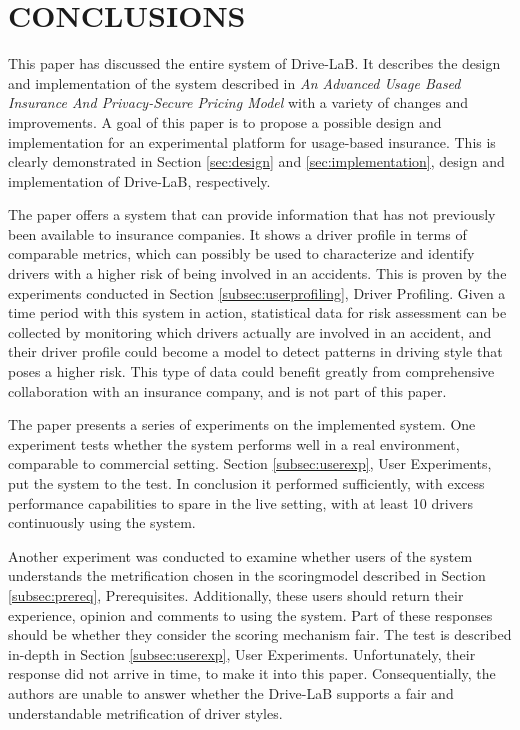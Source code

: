 \section{CONCLUSIONS}\label{sec:conclusion}
This paper has discussed the entire system of Drive-LaB. It describes the design and implementation of the system described in \textit{An Advanced Usage Based Insurance And Privacy-Secure Pricing Model}\citep{sw9_report} with a variety of changes and improvements. A goal of this paper is to propose a possible design and implementation for an experimental platform for usage-based insurance. This is clearly demonstrated in Section \ref{sec:design} and \ref{sec:implementation}, design and implementation of Drive-LaB, respectively.

The paper offers a system that can provide information that has not previously been available to insurance companies. It shows a driver profile in terms of comparable metrics, which can possibly be used to characterize and identify drivers with a higher risk of being involved in an accidents. This is proven by the experiments conducted in Section \ref{subsec:userprofiling}, Driver Profiling. Given a time period with this system in action, statistical data for risk assessment can be collected by monitoring which drivers actually are involved in an accident, and their driver profile could become a model to detect patterns in driving style that poses a higher risk. This type of data could benefit greatly from comprehensive collaboration with an insurance company, and is not part of this paper.

The paper presents a series of experiments on the implemented system. One experiment tests whether the system performs well in a real environment, comparable to commercial setting. Section \ref{subsec:userexp}, User Experiments, put the system to the test. In conclusion it performed sufficiently, with excess performance capabilities to spare in the live setting, with at least 10 drivers continuously using the system.

Another experiment was conducted to examine whether users of the system understands the metrification chosen in the scoringmodel described in Section \ref{subsec:prereq}, Prerequisites. Additionally, these users should return their experience, opinion and comments to using the system. Part of these responses should be whether they consider the scoring mechanism fair. The test is described in-depth in Section \ref{subsec:userexp}, User Experiments. Unfortunately, their response did not arrive in time, to make it into this paper. Consequentially, the authors are unable to answer whether the Drive-LaB supports a fair and understandable metrification of driver styles. 

